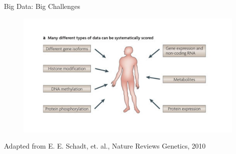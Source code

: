\documentclass[first=dgreen,second=purple,logo=redexc]{aaltoslides}
\begin{document}
\begin{frame} {Big Data: Big Challenges} 
\vspace{-1cm}
\begin{figure}
\centering
 \includegraphics[trim=1cm 1cm 0cm 1cm, clip=true, width=1.2\textwidth]{figures/many}
\end{figure}
\tiny Adapted from E. E. Schadt, et. al., Nature Reviews Genetics, 2010
\end{frame}
\end{document}
